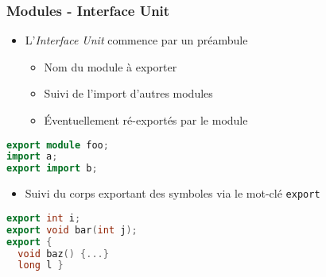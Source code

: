 \documentclass[C++.tex]{subfiles}
\begin{document}
\begin{frame}[fragile]
	\frametitle{Modules - Interface Unit}
	\begin{itemize}
		\item L'\textit{Interface Unit} commence par un préambule
		\begin{itemize}
			\item Nom du module à exporter
			\item Suivi de l'import d'autres modules
			\item Éventuellement ré-exportés par le module
		\end{itemize}
	\end{itemize}

	\begin{lstlisting}[language=C++]
export module foo;
import a;
export import b;\end{lstlisting}

	\begin{itemize}
		\item Suivi du corps exportant des symboles via le mot-clé \lstinline|export|
	\end{itemize}


	\begin{lstlisting}[language=C++]
export int i;
export void bar(int j);
export {
  void baz() {...}
  long l }\end{lstlisting}
\end{frame}
\end{document}
